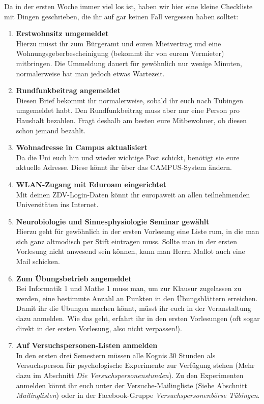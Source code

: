 Da in der ersten Woche immer viel los ist, haben wir hier eine kleine Checkliste mit Dingen geschrieben, die ihr auf gar keinen Fall vergessen haben solltet:
\begin{enumerate}[label=$\bigcirc$]
	\item  \textbf{Erstwohnsitz umgemeldet} \\
	Hierzu müsst ihr zum Bürgeramt und euren Mietvertrag und eine Wohnungsgeberbescheinigung (bekommt ihr von eurem Vermieter) mitbringen. Die Ummeldung dauert für gewöhnlich nur wenige Minuten, normalerweise hat man jedoch etwas Wartezeit.
	
	\item \textbf{Rundfunkbeitrag angemeldet}\\
	Diesen Brief bekommt ihr normalerweise, sobald ihr euch nach Tübingen umgemeldet habt. Den Rundfunkbeitrag muss aber nur eine Person pro Haushalt bezahlen. Fragt deshalb am besten eure Mitbewohner, ob diesen schon jemand bezahlt.	
	
	\item  \textbf{Wohnadresse in Campus aktualisiert}\\
	Da die Uni euch hin und wieder wichtige Post schickt, benötigt sie eure aktuelle Adresse. Diese könnt ihr über das CAMPUS-System ändern.
	
	\item \textbf{WLAN-Zugang mit Eduroam eingerichtet}\\
	Mit deinen ZDV-Login-Daten könnt ihr europaweit an allen teilnehmenden Universitäten ins Internet.
	
	\item  \textbf{Neurobiologie und Sinnesphysiologie Seminar gewählt}\\
	Hierzu geht für gewöhnlich in der ersten Vorlesung eine Liste rum, in die man sich ganz altmodisch per Stift eintragen muss. Sollte man in der ersten Vorlesung nicht anwesend sein können, kann man Herrn Mallot auch eine Mail schicken.
	
	\item  \textbf{Zum Übungsbetrieb angemeldet}\\
	Bei Informatik 1 und Mathe 1 muss man, um zur Klausur zugelassen zu werden, eine bestimmte Anzahl an Punkten in den Übungsblättern erreichen. Damit ihr die Übungen
machen könnt, müsst ihr euch in der Veranstaltung dazu anmelden. Wie das geht,
erfahrt ihr in den ersten Vorlesungen (oft sogar direkt in der ersten Vorlesung, also
nicht verpassen!).

	\item \textbf{Auf Versuchspersonen-Listen anmelden}\\
	In den ersten drei Semestern müssen alle Kognis 30 Stunden als Versuchsperson für psychologische Experimente zur Verfügung stehen (Mehr dazu im Abschnitt \textit{Die Versuchspersonenstunden}). Zu den Experimenten anmelden könnt ihr euch unter der Versuche-Mailingliste (Siehe Abschnitt \textit{Mailinglisten}) oder in der Facebook-Gruppe \textit{Versuchspersonenbörse Tübingen}.
	
	
\end{enumerate}